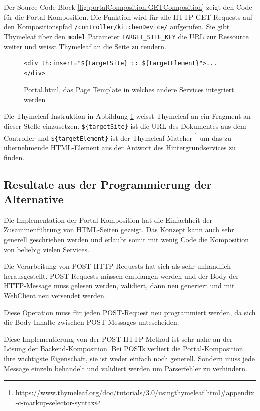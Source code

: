 Der Source-Code-Block  \ref{fig:portalComposition:GETComposition} zeigt den Code für die Portal-Komposition. Die Funktion wird für alle HTTP GET Requests auf den Kompositionspfad \texttt{/controller/kitchenDevice/} aufgerufen. Sie gibt Thymeleaf über den \texttt{model} Parameter \texttt{TARGET\_SITE\_KEY} die URL zur Ressource weiter und weisst Thymeleaf an die Seite zu rendern.

\begin{figure}
    \centering
\begin{lstlisting}
<div th:insert="${targetSite} :: ${targetElement}">...</div>
\end{lstlisting}
    \caption{Portal.html, das Page Template in welches andere Services integriert werden}
    \label{fig:portalComposition:Page}
\end{figure}
Die Thymeleaf Instruktion in Abbildung \ref{fig:portalComposition:Page} weisst Thymeleaf an ein Fragment an dieser Stelle einzusetzen. \texttt{\$\{targetSite\}} ist die URL des Dokumentes aus dem Controller und  \texttt{\$\{targetElement\}} ist der Thymeleaf Matcher \footnote{https://www.thymeleaf.org/doc/tutorials/3.0/usingthymeleaf.html\#appendix-c-markup-selector-syntax} um das zu übernehmende HTML-Element aus der Antwort des Hintergrundservices zu finden.

\subsection{Resultate aus der Programmierung der Alternative}
Die  Implementation der Portal-Komposition hat die Einfachheit der Zusammenführung von HTML-Seiten gezeigt. Das Konzept kann auch sehr generell geschrieben werden und erlaubt somit mit wenig Code die Komposition von beliebig vielen Services.

Die  Verarbeitung von POST HTTP-Requests hat sich als sehr unhandlich herausgestellt. POST-Requests müssen empfangen werden und der Body der HTTP-Message muss gelesen werden, validiert, dann neu generiert und mit WebClient neu versendet werden.

Diese Operation muss für jeden POST-Request neu programmiert werden, da sich die Body-Inhalte zwischen POST-Messages untescheiden.

Diese Implementierung von der POST HTTP Method ist sehr nahe an der Lösung der Backend-Komposition. Bei POSTs verliert die Portal-Komposition ihre wichtigste Eigenschaft, sie ist weder einfach noch generell. Sondern muss jede Message einzeln behandelt und validiert werden um Parserfehler zu verhindern.

